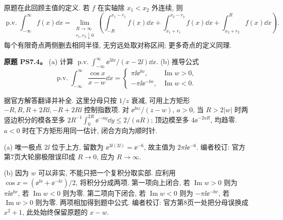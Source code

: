 原题在此回顾主值的定义. 若 $f$ 在实轴除 $x_1<x_2$ 外连续, 则
\[
 \operatorname{p.v.}\int_{-\infty}^{\infty}f(x)\dd x
 =\lim_{\substack{R\to\infty\\r_1,r_2\downarrow0}}
 \left(\int_{-R}^{x_1-r_1}f(x)\dd x+
 \int_{x_1+r_1}^{x_2-r_2}f(x)\dd x+
 \int_{x_2+r_2}^{R}f(x)\dd x\right).
\]
每个有限奇点两侧删去相同半径, 无穷远处取对称区间; 更多奇点的定义同理.

\begin{exercise}
\textbf{原题 PS7.4。}\label{ass:ps7-4}
(a) 计算 $\operatorname{p.v.}\int_{-\infty}^{\infty}\ee^{3\ii x}/(x-2\ii)\dd x$.
(b) 推导公式
\[
 \operatorname{p.v.}\int_{-\infty}^{\infty}\frac{\cos x}{x-w}\dd x
 =\begin{cases}\pi\ii\ee^{\ii w},&\operatorname{Im}w>0,\\
 -\pi\ii\ee^{-\ii w},&\operatorname{Im}w<0.\end{cases}
\]
\end{exercise}
\begin{solution}
据官方解答翻译并补全. 这里分母只按 $1/z$ 衰减, 可用上方矩形 $-R,R,R+2R\ii,-R+2R\ii$ 控制指数项. 对 $\ee^{\ii az}/(z-w)$, $a>0$, 当 $R>2|w|$ 时两竖边积分的模各至多 $2R^{-1}\int_0^{2R}\ee^{-ay}\dd y\le2/(aR)$; 顶边模至多 $4\ee^{-2aR}$, 均趋零. $a<0$ 时在下方矩形用同一估计, 闭合方向为顺时针.

(a) 唯一极点 $2\ii$ 位于上方, 留数为 $\ee^{3\ii(2\ii)}=\ee^{-6}$, 故主值为 $2\pi\ii\ee^{-6}$. 编者校订: 官方第7页大轮廓极限误印成 $R\to0$, 应为 $R\to\infty$.

(b) 因为 $w$ 可以非实, 不能只把一个复积分取实部. 应利用 $\cos x=(\ee^{\ii x}+\ee^{-\ii x})/2$, 将积分分成两项. 第一项向上闭合, 若 $\operatorname{Im}w>0$ 则为 $\pi\ii\ee^{\ii w}$, 若 $\operatorname{Im}w<0$ 则为零. 第二项向下闭合, 若 $\operatorname{Im}w<0$ 则为 $-\pi\ii\ee^{-\ii w}$, 若 $\operatorname{Im}w>0$ 则为零. 两项相加得到题中公式. 编者校订: 官方第8页一处把分母误换成 $x^2+1$, 此处始终保留原题的 $x-w$.
\end{solution}

